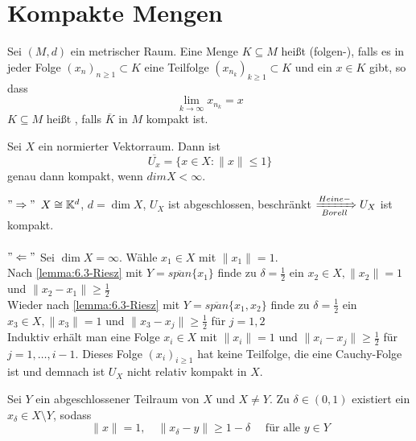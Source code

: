 
\section{Kompakte Mengen}


\begin{definition}  
	Sei $(M, d)$ ein metrischer Raum. Eine Menge $K \subseteq M$ hei{\ss}t (folgen-), falls es in jeder Folge $(x_{n})_{n \geq 1} \subset K$ eine Teilfolge $(x_{n_{k}})_{k \geq 1} \subset K$ und ein $x \in K$ gibt, so dass 
		\[ \lim_{k \rightarrow \infty} x_{n_{k}} = x \]
		$K \subseteq M$ hei{\ss}t , falls $\overline{K}$ in $M$ kompakt ist.
\end{definition}


\begin{satz} \label{satz-6.2}
	Sei $X$ ein normierter Vektorraum. Dann ist
	\[ \overline{U_{x}} = \{ x \in X: \| x \| \leq 1 \} \]
	genau dann kompakt, wenn $dim X < \infty$.
\end{satz}
 
\begin{beweis}
	$"\Rightarrow"$ $X \cong \mathbb{K}^{d}$, $d = \dim X$, $U_X$ ist abgeschlossen, beschränkt $\xRightarrow[Borell]{Heine-} U_{X}$ ist kompakt. \\ \\
	$"\Leftarrow"$ Sei $\dim X = \infty$. Wähle $x_1 \in X$ mit $\| x_1 \| = 1$. \\
	Nach \eqref{lemma:6.3-Riesz} mit $ Y = \overline{span}\{ x_{1} \}$ finde zu $\delta = \frac{1}{2}$ ein $x_{2} \in X, \| x_{2} \| = 1$ und $\| x_{2} - x_{1} \| \geq \frac{1}{2}$ \\
	Wieder nach \eqref{lemma:6.3-Riesz} mit $ Y = \overline{span}\{ x_{1}, x_{2} \}$ finde zu $\delta = \frac{1}{2}$ ein $x_{3} \in X, \| x_{3} \| = 1$ und $\| x_{3} - x_{j} \| \geq \frac{1}{2}$ für $j = 1, 2$ \\
	Induktiv erhält man eine Folge $x_{i} \in X$ mit $\| x_{i} \| = 1$ und $\| x_{i} - x_{j} \| \geq \frac{1}{2}$ für $j = 1, \dotsc, i - 1$.
	Dieses Folge $(x_{i})_{i \geq 1}$ hat keine Teilfolge, die eine Cauchy-Folge ist und demnach ist $U_{X}$ nicht relativ kompakt in $X$. 
\end{beweis}


\begin{lemma}[Riesz] \label{lemma:6.3-Riesz} 
	Sei $Y$ ein abgeschlossener Teilraum von $X$ und $X \neq Y$. Zu $\delta \in (0, 1)$ existiert ein $x_{\delta} \in X \setminus Y$, sodass
	\[ \| x \| = 1, \quad \| x_{\delta} - y\| \geq 1 - \delta \quad \text{ für alle } y \in Y \]
\end{lemma}

